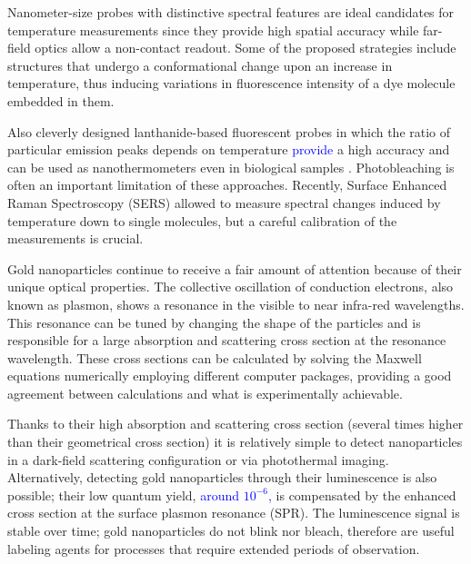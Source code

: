 \documentclass[journal=nalefd,manuscript=letter]{achemso}
\newcommand{\HI}[1]{\textcolor{blue}{#1}} %
\begin{document}
Nanometer-size probes with distinctive spectral features are ideal candidates
for temperature measurements since they provide high spatial accuracy while
far-field optics allow a non-contact readout. Some of the proposed strategies
include structures that undergo a conformational change upon an increase in
temperature\cite{Ebrahimi2014}, thus inducing variations in fluorescence
intensity of a dye molecule embedded in them.

Also cleverly designed lanthanide-based fluorescent probes in which the ratio of
particular emission peaks depends on temperature \HI{provide} a high accuracy and can
be used as nanothermometers \cite{liu2016ratiometric} even in biological samples
\cite{Vetrone2010}. Photobleaching is often an important limitation of these
approaches. Recently, Surface Enhanced Raman Spectroscopy (SERS) allowed to
measure spectral changes induced by temperature down to single
molecules\cite{Pozzi2015}, but a careful calibration of the measurements is
crucial.

Gold nanoparticles continue to receive a fair amount of attention because of
their unique optical properties\cite{Zijlstra2011}. The collective oscillation
of conduction electrons, also known as plasmon, shows a resonance in the visible to
near infra-red wavelengths. This resonance can be tuned by changing the shape of
the particles\cite{Carattino2016} and is responsible for a large absorption
and scattering cross section at the resonance wavelength. These cross sections can
be calculated by solving the Maxwell equations numerically employing different computer
packages\cite{Draine1994,Yurkin2011,Oskooi2010}, providing a good agreement
between calculations and what is experimentally achievable. 

Thanks to their high absorption and scattering cross section (several times higher
than their geometrical cross section) it is relatively simple to detect
nanoparticles in a dark-field scattering configuration\cite{Hu2008} or via
photothermal imaging\cite{boyer2002photothermal, Berciaud2006}.
Alternatively, detecting gold nanoparticles through their
luminescence\cite{Tcherniak2011} is also possible; their low quantum
yield\cite{Fang2012,Rao2015,Yorulmaz2012,Cheng2015}, \HI{around $10^{-6}$,}	
is compensated by the enhanced cross section at the surface plasmon resonance
(SPR). The luminescence signal is stable over time; gold nanoparticles do not
blink nor bleach, therefore are useful labeling agents for processes that
require extended periods of observation\cite{Wang2005}.
\end{document}
